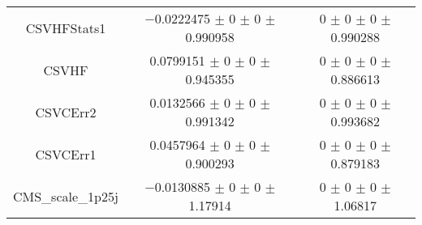 \begin{table}
\begin{tabular}{ccc}
CSVHFStats1 	& \num{-0.0222475} $\pm$ \num{0} $\pm$ \num{0} $\pm$ \num{0.990958} 	& \num{0} $\pm$ \num{0} $\pm$ \num{0} $\pm$ \num{0.990288}\\
CSVHF 	& \num{0.0799151} $\pm$ \num{0} $\pm$ \num{0} $\pm$ \num{0.945355} 	& \num{0} $\pm$ \num{0} $\pm$ \num{0} $\pm$ \num{0.886613}\\
CSVCErr2 	& \num{0.0132566} $\pm$ \num{0} $\pm$ \num{0} $\pm$ \num{0.991342} 	& \num{0} $\pm$ \num{0} $\pm$ \num{0} $\pm$ \num{0.993682}\\
CSVCErr1 	& \num{0.0457964} $\pm$ \num{0} $\pm$ \num{0} $\pm$ \num{0.900293} 	& \num{0} $\pm$ \num{0} $\pm$ \num{0} $\pm$ \num{0.879183}\\
CMS\_scale\_1p25j 	& \num{-0.0130885} $\pm$ \num{0} $\pm$ \num{0} $\pm$ \num{1.17914} 	& \num{0} $\pm$ \num{0} $\pm$ \num{0} $\pm$ \num{1.06817}\\
\bottomrule
\end{tabular}
\end{table}